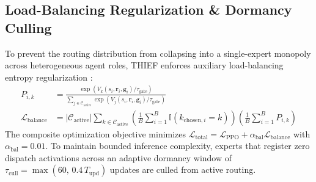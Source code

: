\subsection{Load-Balancing Regularization \& Dormancy Culling}
To prevent the routing distribution from collapsing into a single-expert monopoly across heterogeneous agent roles, THIEF enforces auxiliary load-balancing entropy regularization \citep{fedus2022switch}:
\begin{align}
P_{i,k} &= \frac{\exp(V_k(s_i, \mathbf{r}_i, \mathbf{g}_i) / \tau_{\text{gate}})}{\sum_{j \in \mathcal{C}_{\text{active}}} \exp(V_j(s_i, \mathbf{r}_i, \mathbf{g}_i) / \tau_{\text{gate}})} \\
\mathcal{L}_{\text{balance}} &= |\mathcal{C}_{\text{active}}| \sum_{k \in \mathcal{C}_{\text{active}}} \left(\frac{1}{B}\sum_{i=1}^B \mathbb{I}(k_{\text{chosen},i}=k)\right) \left(\frac{1}{B}\sum_{i=1}^B P_{i,k}\right)
\end{align}
The composite optimization objective minimizes $\mathcal{L}_{\text{total}} = \mathcal{L}_{\text{PPO}} + \alpha_{\text{bal}} \mathcal{L}_{\text{balance}}$ with $\alpha_{\text{bal}} = 0.01$. To maintain bounded inference complexity, experts that register zero dispatch activations across an adaptive dormancy window of $\tau_{\text{cull}} = \max(60,\, 0.4\,T_{\text{upd}})$ updates are culled from active routing.

